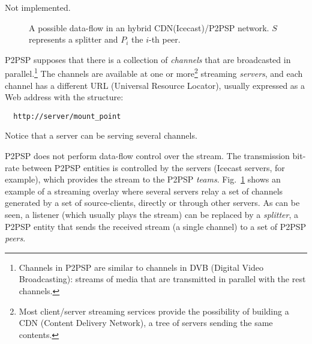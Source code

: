 

\label{sec:LBS}

\begin{note}
  Not implemented.
\end{note}

\begin{figure}
  \caption{A possible data-flow in an hybrid CDN(Icecast)/P2PSP
    network. $S$ represents a splitter and $P_i$ the $i$-th
    peer.} %
  \label{fig:icecast-P2PSP}
\end{figure}

P2PSP supposes that there is a collection of \emph{channels} that are
broadcasted in parallel.\footnote{Channels in P2PSP are similar to
  channels in DVB (Digital Video Broadcasting): streams of media that
  are transmitted in parallel with the rest channels.} The channels
are available at one or more\footnote{Most client/server streaming
  services provide the possibility of building a CDN (Content Delivery
  Network), a tree of servers sending the same contents.} streaming
\emph{servers}, and each channel has a different URL (Universal
Resource Locator), usually expressed as a Web address with the
structure:
\begin{verbatim}
  http://server/mount_point
\end{verbatim}
Notice that a server can be serving several channels.

P2PSP does not perform data-flow control over the stream. The
transmission bit-rate between P2PSP entities is controlled by the
servers (Icecast servers, for example), which provides the stream to
the P2PSP \emph{teams}. Fig.~\ref{fig:icecast-P2PSP} shows an example
of a streaming overlay where several servers relay a set of channels
generated by a set of source-clients, directly or through other
servers. As can be seen, a listener (which usually plays the stream)
can be replaced by a \emph{splitter}, a P2PSP entity that sends the
received stream (a single channel) to a set of P2PSP \emph{peers}.


